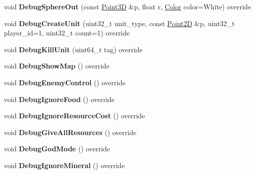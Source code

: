 \begin{DoxyCompactItemize}
void {\bfseries Debug\+Sphere\+Out} (const \hyperlink{structsc2_1_1_point3_d}{Point3D} \&p, float r, \hyperlink{structsc2_1_1_color}{Color} color=White) override
\item 
\mbox{\label{classsc2_1_1_debug_imp_a8be6395b9de4f2c32211598d08cc0255}} 
void {\bfseries Debug\+Create\+Unit} (uint32\+\_\+t unit\+\_\+type, const \hyperlink{structsc2_1_1_point2_d}{Point2D} \&p, uint32\+\_\+t player\+\_\+id=1, uint32\+\_\+t count=1) override
\item 
\mbox{\label{classsc2_1_1_debug_imp_a981682421cb2a976911218a0d9103038}} 
void {\bfseries Debug\+Kill\+Unit} (uint64\+\_\+t tag) override
\item 
\mbox{\label{classsc2_1_1_debug_imp_aa77697216c9609f495712e7b1dbb0b12}} 
void {\bfseries Debug\+Show\+Map} () override
\item 
\mbox{\label{classsc2_1_1_debug_imp_a687e85a9eada2375857b1fc53635a624}} 
void {\bfseries Debug\+Enemy\+Control} () override
\item 
\mbox{\label{classsc2_1_1_debug_imp_adfed731f5142b66f0be5b585b6f1655d}} 
void {\bfseries Debug\+Ignore\+Food} () override
\item 
\mbox{\label{classsc2_1_1_debug_imp_a955cd75495255b30ff5551b6d325fa3b}} 
void {\bfseries Debug\+Ignore\+Resource\+Cost} () override
\item 
\mbox{\label{classsc2_1_1_debug_imp_a688021c57aa456e6c8737a4be6f1051e}} 
void {\bfseries Debug\+Give\+All\+Resources} () override
\item 
\mbox{\label{classsc2_1_1_debug_imp_aa6b130a343add32871908f6ad4f93591}} 
void {\bfseries Debug\+God\+Mode} () override
\item 
\mbox{\label{classsc2_1_1_debug_imp_a5543731dfb970a026edba747285ef547}} 
void {\bfseries Debug\+Ignore\+Mineral} () override
\item 
\mbox{\label{classsc2_1_1_debug_imp_a803598fc7f280b0f4b44f8a3a25fc270}} 

\end{DoxyCompactItemize}
